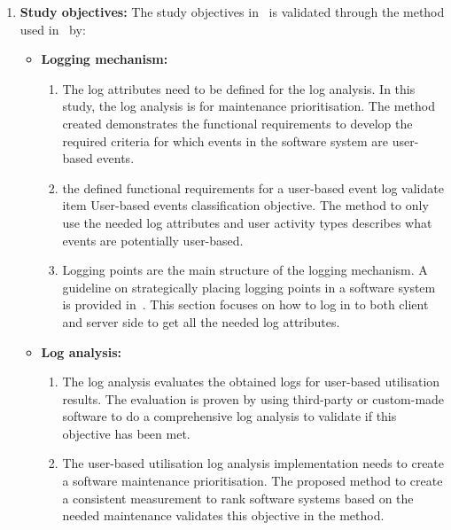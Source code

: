 \begin{enumerate}[label=\textbf{\Roman*.}]
	\item \textbf{Study objectives:} The study objectives in~ is validated through the method used in~ by:
		\begin{itemize}
			\item \textbf{Logging mechanism:}
			  \begin{enumerate}
				\item The log attributes need to be defined for the log analysis. In this study, the log analysis is for maintenance prioritisation. The method created demonstrates the functional requirements to develop the required criteria for which events in the software system are user-based events.
				\item the defined functional requirements for a user-based event log validate item User-based events classification objective. The method to only use the needed log attributes and user activity types describes what events are potentially user-based.
				\item Logging points are the main structure of the logging mechanism. A guideline on strategically placing logging points in a software system is provided in~. This section focuses on how to log in to both client and server side to get all the needed log attributes.
			  \end{enumerate}

			\item \textbf{Log analysis:}
			 \begin{enumerate}
				\item The log analysis evaluates the obtained logs for user-based utilisation results. The evaluation is proven by using third-party or custom-made software to do a comprehensive log analysis to validate if this objective has been met.
				\item The user-based utilisation log analysis implementation needs to create a software maintenance prioritisation. The proposed method to create a consistent measurement to rank software systems based on the needed maintenance validates this objective in the method.
			 \end{enumerate}
		\end{itemize}


\end{enumerate}
